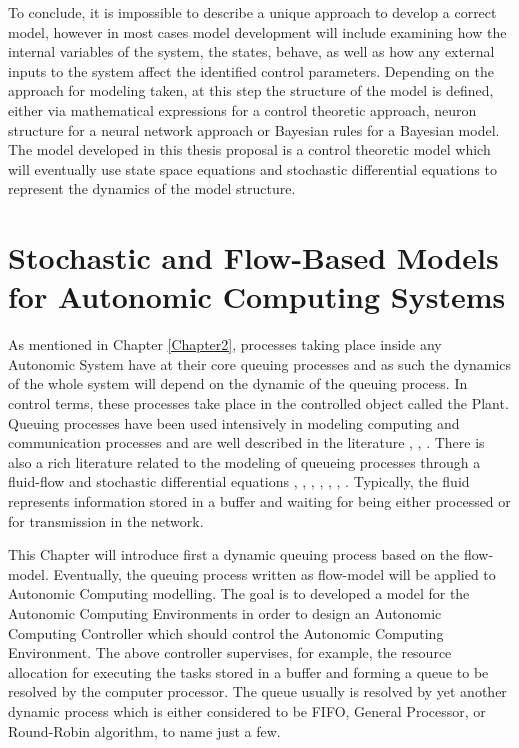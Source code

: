 To conclude, it is impossible to describe a unique approach to develop a correct model, however in most cases model development will include examining how the internal variables of the system, the states, behave, as well as how any external inputs to the system affect the identified control parameters. Depending on the approach for modeling taken, at this step the structure of the model is defined, either via mathematical expressions for a control theoretic approach, neuron structure for a neural network approach or Bayesian rules for a Bayesian model. The model developed in this thesis proposal is a control theoretic model which will eventually use state space equations and stochastic differential equations to represent the dynamics of the model structure. 

\section{Stochastic and Flow-Based Models for Autonomic Computing Systems}

As mentioned in Chapter \ref{Chapter2}, processes taking place inside any Autonomic System have at their core queuing processes and as such the dynamics of the whole system will depend on the dynamic of the queuing process. 
In control terms, these processes take place in the controlled object called the Plant. Queuing processes have been used intensively in modeling computing and communication processes and are well described in the literature \cite{model:queue1}, \cite{model:queue2}, \cite{model:queue3}. There is also a rich literature related to the modeling of queueing processes through a fluid-flow and stochastic differential equations \cite{model:red1}, \cite{model:red2}, \cite{related:model:SeanMeyn2007}, \cite{model:fluidflow}, \cite{model:fluidflow2}, \cite{model:fluidflow3}, \cite{model:fluidflow4}. Typically, the fluid represents information stored in a buffer and waiting for being either processed or for transmission in the network.

This Chapter will introduce first a dynamic queuing process based on the flow-model. Eventually, the queuing process written as flow-model will be applied to Autonomic Computing modelling. The goal is to developed a model for the Autonomic Computing Environments in order to design an Autonomic Computing Controller which should control the Autonomic Computing Environment. The above controller supervises, for example, the resource allocation for executing the tasks stored in a buffer and forming a  queue to be resolved by the computer processor. The queue usually is resolved by yet another dynamic process which is either considered to be FIFO, General Processor, or Round-Robin algorithm, to name just a few.


